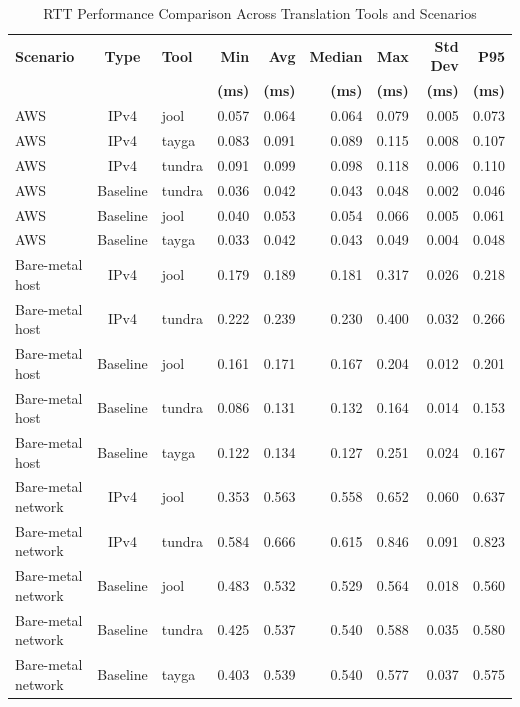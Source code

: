 \begin{table}[htbp]
\centering
\caption{RTT Performance Comparison Across Translation Tools and Scenarios}
\label{tab:rtt_comparison}
\footnotesize
\begin{tabular}{|l|c|l|r|r|r|r|r|r|}
\hline
\textbf{Scenario} & \textbf{Type} & \textbf{Tool} & \textbf{Min} & \textbf{Avg} & \textbf{Median} & \textbf{Max} & \textbf{Std Dev} & \textbf{P95}  \\
 & & & \textbf{(ms)} & \textbf{(ms)} & \textbf{(ms)} & \textbf{(ms)} & \textbf{(ms)} & \textbf{(ms)}  \\
\hline
AWS & IPv4 & jool & 0.057 & 0.064 & 0.064 & 0.079 & 0.005 & 0.073   \\
AWS & IPv4 & tayga & 0.083 & 0.091 & 0.089 & 0.115 & 0.008 & 0.107   \\
AWS & IPv4 & tundra & 0.091 & 0.099 & 0.098 & 0.118 & 0.006 & 0.110   \\
AWS & Baseline & tundra & 0.036 & 0.042 & 0.043 & 0.048 & 0.002 & 0.046   \\
AWS & Baseline & jool & 0.040 & 0.053 & 0.054 & 0.066 & 0.005 & 0.061   \\
AWS & Baseline & tayga & 0.033 & 0.042 & 0.043 & 0.049 & 0.004 & 0.048   \\
\hline
Bare-metal host & IPv4 & jool & 0.179 & 0.189 & 0.181 & 0.317 & 0.026 & 0.218   \\
Bare-metal host & IPv4 & tundra & 0.222 & 0.239 & 0.230 & 0.400 & 0.032 & 0.266   \\
Bare-metal host & Baseline & jool & 0.161 & 0.171 & 0.167 & 0.204 & 0.012 & 0.201   \\
Bare-metal host & Baseline & tundra & 0.086 & 0.131 & 0.132 & 0.164 & 0.014 & 0.153   \\
Bare-metal host & Baseline & tayga & 0.122 & 0.134 & 0.127 & 0.251 & 0.024 & 0.167   \\
\hline
Bare-metal network & IPv4 & jool & 0.353 & 0.563 & 0.558 & 0.652 & 0.060 & 0.637   \\
Bare-metal network & IPv4 & tundra & 0.584 & 0.666 & 0.615 & 0.846 & 0.091 & 0.823   \\
Bare-metal network & Baseline & jool & 0.483 & 0.532 & 0.529 & 0.564 & 0.018 & 0.560   \\
Bare-metal network & Baseline & tundra & 0.425 & 0.537 & 0.540 & 0.588 & 0.035 & 0.580   \\
Bare-metal network & Baseline & tayga & 0.403 & 0.539 & 0.540 & 0.577 & 0.037 & 0.575   \\
\hline
\end{tabular}
\end{table}

